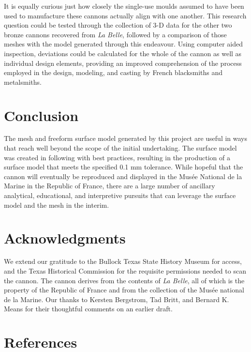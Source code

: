 \documentclass[review]{elsarticle}
\begin{document}
It is equally curious just how closely the single-use moulds assumed to have been used to manufacture these cannons actually align with one another. This research question could be tested through the collection of 3-D data for the other two bronze cannons recovered from \textit{ La Belle}, followed by a comparison of those meshes with the model generated through this endeavour. Using computer aided inspection, deviations could be calculated for the whole of the cannon as well as individual design elements, providing an improved comprehension of the process employed in the design, modeling, and casting by French blacksmiths and metalsmiths.

\section*{Conclusion}

The mesh and freeform surface model generated by this project are useful in ways that reach well beyond the scope of the initial undertaking. The surface model was created in following with best practices, resulting in the production of a surface model that meets the specified 0.1 mm tolerance. While hopeful that the cannon will eventually be reproduced and displayed in the Musée National de la Marine in the Republic of France, there are a large number of ancillary analytical, educational, and interpretive pursuits that can leverage the surface model and the mesh in the interim.

\section*{Acknowledgments}

We extend our gratitude to the Bullock Texas State History Museum for access, and the Texas Historical Commission for the requisite permissions needed to scan the cannon. The cannon derives from the contents of \textit{La Belle}, all of which is the property of the Republic of France and from the collection of the Musée national de la Marine. Our thanks to Kersten Bergstrom, Tad Britt, and Bernard K. Means for their thoughtful comments on an earlier draft.

\section*{References}



\end{document}
